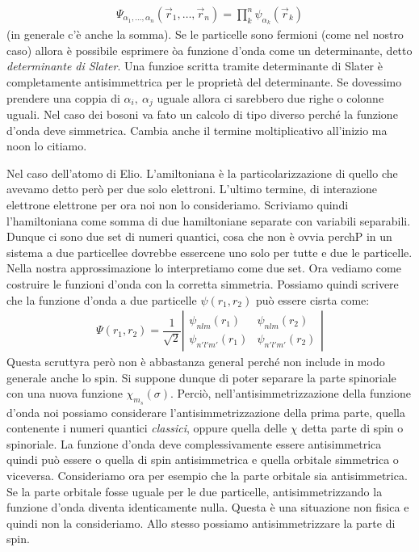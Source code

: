 \documentclass[../AppuntiStruttura]{subfiles}
\begin{document}
		\begin{gather}
		\Psi_{\alpha_{1},\dots,\alpha_{n}}(\vec{r}_{1},\dots,\vec{r}_{n})=\prod_{k}^{n}\psi_{\alpha_{k}}(\vec{r}_{k})
		\end{gather}
		(in generale c'è anche la somma). Se le particelle sono fermioni (come nel nostro caso) allora è possibile esprimere òa funzione d'onda come un determinante, detto \emph{determinante di Slater}. Una funzioe scritta tramite determinante di Slater è completamente antisimmettrica per le proprietà del determinante. Se dovessimo prendere una coppia di $ \alpha_{i},\ \alpha_{j} $ uguale allora ci sarebbero due righe o colonne uguali. Nel caso dei bosoni va fato un calcolo di tipo diverso perché la funzione d'onda deve simmetrica. Cambia anche il termine moltiplicativo all'inizio ma noon lo citiamo. 
		
		Nel caso dell'atomo di Elio. L'amiltoniana è la particolarizzazione di quello che avevamo detto però per due solo elettroni. L'ultimo termine, di interazione elettrone elettrone per ora noi non lo consideriamo. Scriviamo quindi l'hamiltoniana come somma di due hamiltoniane separate con variabili separabili. Dunque ci sono due set di numeri quantici, cosa che non è ovvia perchP in un sistema a due particellee dovrebbe essercene uno solo per tutte e due le particelle. Nella nostra approssimazione lo interpretiamo come due set. Ora vediamo come costruire le funzioni d'onda con la corretta simmetria. Possiamo quindi scrivere che la funzione d'onda a due particelle $ \psi(r_{1},r_{2}) $ può essere cisrta come:
		\begin{gather}
		\Psi(r_{1},r_{2})=\dfrac{1}{\sqrt{2}}\left|\begin{array}{cc}
		\psi_{nlm}(r_{1}) & \psi_{nlm}(r_{2}) \\ 
		\psi_{n'l'm'}(r_{1}) & \psi_{n'l'm'}(r_{2})
		\end{array} \right|
		\end{gather}
		Questa scruttyra però non è abbastanza general perché non include in modo generale anche lo spin. Si suppone dunque di poter separare la parte spinoriale con una nuova funzione $ \chi_{m_{s}}\left(\sigma\right) $. Perciò, nell'antisimmetrizzazione della funzione d'onda noi possiamo considerare l'antisimmetrizzazione della prima parte, quella contenente i numeri quantici \emph{classici}, oppure quella delle $ \chi $ detta parte di spin o spinoriale. La funzione d'onda deve complessivamente essere antisimmetrica quindi può essere o quella di spin antisimmetrica e quella orbitale simmetrica o viceversa. Consideriamo ora per esempio che la parte orbitale sia antisimmetrica. Se la parte orbitale fosse uguale per le due particelle, antisimmetrizzando la funzione d'onda diventa identicamente nulla. Questa è una situazione non fisica e quindi non la consideriamo. Allo stesso possiamo antisimmetrizzare la parte di spin.
		
\end{document}
